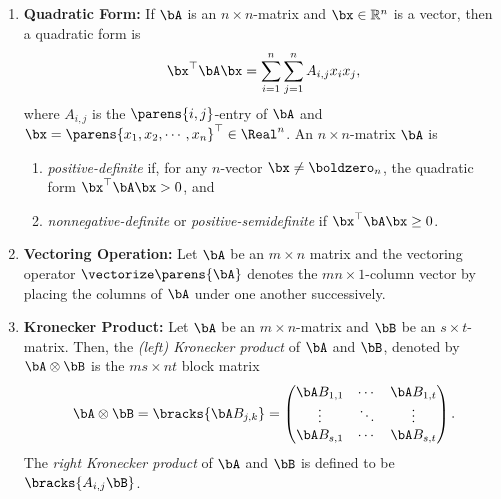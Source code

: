 \documentclass[12pt]{article}
\begin{document}
\begin{enumerate}[label=\textbf{\arabic*.}]
	\item \textbf{Quadratic Form:} If $\bA$ is an $n \times n$-matrix and $\bx \in \mathbb{R}^n$ is a vector, then a quadratic form is
	\begin{align*}
		\bx^\top \bA \bx = \sum_{i=1}^n \sum_{j=1}^n A_{i,j} x_i x_j, 
	\end{align*}
	where $A_{i,j}$ is the $\parens{i,j}$-entry of $\bA$ and $\bx = \parens{x_1, x_2, \cdots, x_n}^\top \in \Real^n$. An $n \times n$-matrix $\bA$ is 
	\begin{enumerate}
		\item \textit{positive-definite} if, for any $n$-vector $\bx \ne \boldzero_n$, the quadratic form $\bx^\top \bA \bx > 0$, and 
		\item \textit{nonnegative-definite} or \textit{positive-semidefinite} if $\bx^\top \bA \bx \ge 0$. 
	\end{enumerate}
	
	\item \textbf{Vectoring Operation:} Let $\bA$ be an $m \times n$ matrix and the vectoring operator $\vectorize \parens{\bA}$ denotes the $mn \times 1$-column vector by placing the columns of $\bA$ under one another successively. 
	
	\item \textbf{Kronecker Product:} Let $\bA$ be an $m \times n$-matrix and $\bB$ be an $s \times t$-matrix. Then, the \textit{(left) Kronecker product} of $\bA$ and $\bB$, denoted by $\bA \otimes \bB$ is the $ms \times nt$ block matrix 
	\begin{align}
		\bA \otimes \bB = \bracks{\bA B_{j,k}} = \begin{pmatrix}
			\bA B_{1,1} & \cdots & \bA B_{1,t} \\ 
			\vdots & \ddots & \vdots \\ 
			\bA B_{s,1} & \cdots & \bA B_{s,t}
		\end{pmatrix}. 
	\end{align} 
	The \textit{right Kronecker product} of $\bA$ and $\bB$ is defined to be $\bracks{A_{i,j} \bB}$. 
	

\end{enumerate}
\end{document}

